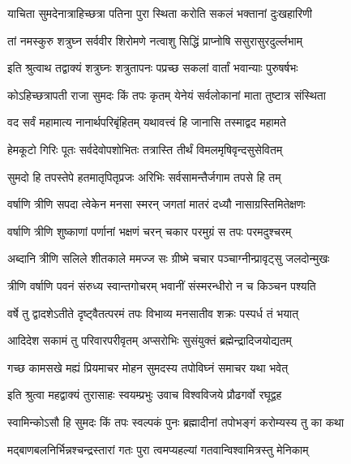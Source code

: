 \twolineshloka
{याचिता सुमदेनात्राहिच्छत्रा पतिना पुरा}
{स्थिता करोति सकलं भक्तानां दुःखहारिणी}%

\twolineshloka
{तां नमस्कुरु शत्रुघ्न सर्ववीर शिरोमणे}
{नत्वाशु सिद्धिं प्राप्नोषि ससुरासुरदुर्ल्लभाम्}%

\twolineshloka
{इति श्रुत्वाथ तद्वाक्यं शत्रुघ्नः शत्रुतापनः}
{पप्रच्छ सकलां वार्तां भवान्याः पुरुषर्षभः}%


\twolineshloka
{कोऽहिच्छत्रापती राजा सुमदः किं तपः कृतम्}
{येनेयं सर्वलोकानां माता तुष्टात्र संस्थिता}%

\twolineshloka
{वद सर्वं महामात्य नानार्थपरिबृंहितम्}
{यथावत्त्वं हि जानासि तस्माद्वद महामते}%


\twolineshloka
{हेमकूटो गिरिः पूतः सर्वदेवोपशोभितः}
{तत्रास्ति तीर्थं विमलमृषिवृन्दसुसेवितम्}%

\twolineshloka
{सुमदो हि तपस्तेपे हतमातृपितृप्रजः}
{अरिभिः सर्वसामन्तैर्जगाम तपसे हि तम्}%

\twolineshloka
{वर्षाणि त्रीणि सपदा त्वेकेन मनसा स्मरन्}
{जगतां मातरं दध्यौ नासाग्रस्तिमितेक्षणः}%

\twolineshloka
{वर्षाणि त्रीणि शुष्काणां पर्णानां भक्षणं चरन्}
{चकार परमुग्रं स तपः परमदुश्चरम्}%

\twolineshloka
{अब्दानि त्रीणि सलिले शीतकाले ममज्ज सः}
{ग्रीष्मे चचार पञ्चाग्नीन्प्रावृट्सु जलदोन्मुखः}%

\twolineshloka
{त्रीणि वर्षाणि पवनं संरुध्य स्वान्तगोचरम्}
{भवानीं संस्मरन्धीरो न च किञ्चन पश्यति}%

\twolineshloka
{वर्षे तु द्वादशेऽतीते दृष्ट्वैतत्परमं तपः}
{विभाव्य मनसातीव शक्रः पस्पर्ध तं भयात्}%

\twolineshloka
{आदिदेश सकामं तु परिवारपरीवृतम्}
{अप्सरोभिः सुसंयुक्तं ब्रह्मेन्द्रादिजयोद्यतम्}%

\twolineshloka
{गच्छ कामसखे मह्यं प्रियमाचर मोहन}
{सुमदस्य तपोविघ्नं समाचर यथा भवेत्}%

\twolineshloka
{इति श्रुत्वा महद्वाक्यं तुरासाहः स्वयम्प्रभुः}
{उवाच विश्वविजये प्रौढगर्वो रघूद्वह}%


\twolineshloka
{स्वामिन्कोऽसौ हि सुमदः किं तपः स्वल्पकं पुनः}
{ब्रह्मादीनां तपोभङ्गं करोम्यस्य तु का कथा}%

\twolineshloka
{मद्बाणबलनिर्भिन्नश्चन्द्रस्तारां गतः पुरा}
{त्वमप्यहल्यां गतवान्विश्वामित्रस्तु मेनिकाम्}%

